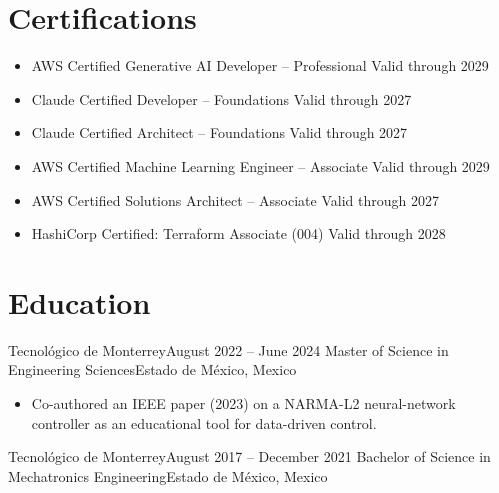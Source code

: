 \documentclass[10pt,letterpaper]{article}
\begin{document}
\section*{Certifications}
\begin{itemize}
  \item AWS Certified Generative AI Developer -- Professional \hfill Valid through 2029
  \item Claude Certified Developer -- Foundations \hfill Valid through 2027
  \item Claude Certified Architect -- Foundations \hfill Valid through 2027
  \item AWS Certified Machine Learning Engineer -- Associate \hfill Valid through 2029
  \item AWS Certified Solutions Architect -- Associate \hfill Valid through 2027
  \item HashiCorp Certified: Terraform Associate (004) \hfill Valid through 2028
\end{itemize}

\section*{Education}

\entry
{Tecnológico de Monterrey}{August 2022 -- June 2024}
{Master of Science in Engineering Sciences}{Estado de México, Mexico}
\begin{itemize}
  \item Co-authored an IEEE paper (2023) on a NARMA-L2 neural-network controller as an educational tool for data-driven control.
\end{itemize}

\entry
{Tecnológico de Monterrey}{August 2017 -- December 2021}
{Bachelor of Science in Mechatronics Engineering}{Estado de México, Mexico}
\end{document}
